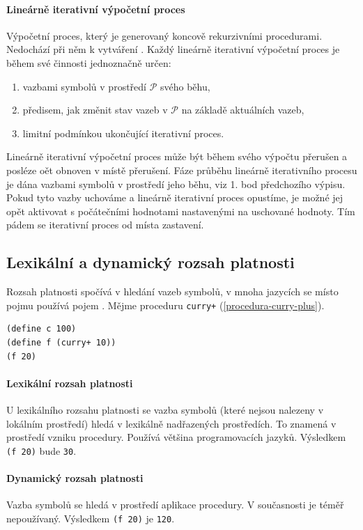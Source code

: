 \documentclass[10pt,a4paper]{article}
\begin{document}
    \paragraph{Lineárně iterativní výpočetní proces}
      Výpočetní proces, který je generovaný koncově rekurzivními procedurami. Nedochází při něm k vytváření . Každý lineárně iterativní výpočetní proces je během své činnosti jednoznačně určen:
      \begin{enumerate}
        \item vazbami symbolů v prostředí $\mathcal{P}$ svého běhu,
        \item předisem, jak změnit stav vazeb v $\mathcal{P}$ na základě aktuálních vazeb,
        \item limitní podmínkou ukončující iterativní proces.
      \end{enumerate}
      Lineárně iterativní výpočetní proces může být během svého výpočtu přerušen a posléze oět obnoven v místě přerušení. Fáze průběhu lineárně iterativního procesu je dána vazbami symbolů v prostředí jeho běhu, viz 1. bod předchozího výpisu. Pokud tyto vazby uchováme a lineárně iterativní proces opustíme, je možné jej opět aktivovat s počátečními hodnotami nastavenými na uschované hodnoty. Tím pádem se iterativní proces  od místa zastavení.
  \subsection{Lexikální a dynamický rozsah platnosti}
    Rozsah platnosti spočívá v hledání vazeb symbolů, v mnoha jazycích se místo pojmu  používá pojem . Mějme proceduru \texttt{curry+} (\ref{procedura-curry-plus}).
    \begin{verbatim}
(define c 100)
(define f (curry+ 10))
(f 20)
    \end{verbatim}
    \paragraph{Lexikální rozsah platnosti}
      U lexikálního rozsahu platnosti se vazba symbolů (které nejsou nalezeny v lokálním prostředí) hledá v lexikálně nadřazených prostředích. To znamená v prostředí vzniku procedury. Používá většina programovacích jazyků. Výsledkem \texttt{(f 20)} bude \texttt{30}.
    \paragraph{Dynamický rozsah platnosti}
      Vazba symbolů se hledá v prostředí aplikace procedury. V současnosti je téměř nepoužívaný. Výsledkem \texttt{(f 20)} je \texttt{120}.
      
\end{document}
